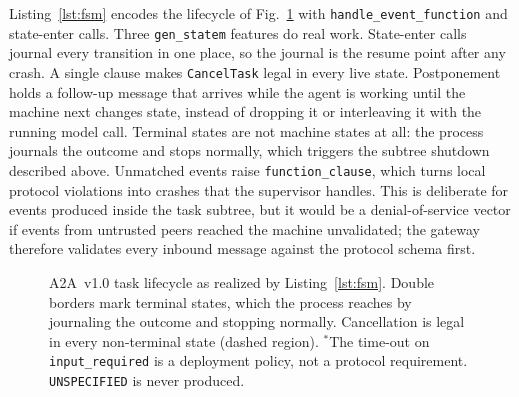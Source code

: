 \documentclass[conference,letterpaper]{IEEEtran}
\newcommand{\code}[1]{\texttt{#1}}
\newcommand{\gsm}{\code{gen\_statem}}
\begin{document}
Listing~\ref{lst:fsm} encodes the lifecycle of Fig.~\ref{fig:fsm} with
\code{handle\_event\_function} and state-enter calls. Three \gsm{} features
do real work. State-enter calls journal every transition in one place, so
the journal is the resume point after any crash. A single clause makes
\code{CancelTask} legal in every live state. Postponement holds a follow-up
message that arrives while the agent is working until the machine next
changes state, instead of dropping it or interleaving it with the running
model call. Terminal states are not machine states at all: the process
journals the outcome and stops normally, which triggers the subtree shutdown
described above. Unmatched events raise \code{function\_clause}, which turns
local protocol violations into crashes that the supervisor handles. This is
deliberate for events produced inside the task subtree, but it would be a
denial-of-service vector if events from untrusted peers reached the machine
unvalidated; the gateway therefore validates every inbound message against
the protocol schema first.

\begin{figure}[t]
\centering
{}
\caption{A2A~v1.0 task lifecycle as realized by Listing~\ref{lst:fsm}.
Double borders mark terminal states, which the process reaches by journaling
the outcome and stopping normally. Cancellation is legal in every
non-terminal state (dashed region). $^{*}$The time-out on
\code{input\_required} is a deployment policy, not a protocol requirement.
\code{UNSPECIFIED} is never produced.}
\label{fig:fsm}
\end{figure}
\end{document}

